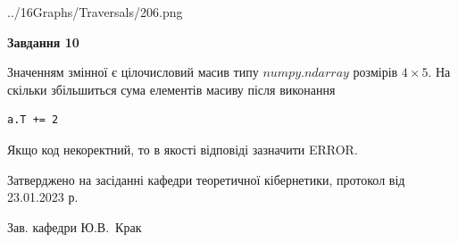 \documentclass[12pt, ukrainian]{article}
\begin{document}
{\begin {large}
\begin{center}
	{../16Graphs/Traversals/206.png}
\end{center}\par
\newpage

{\begin {center}\textbf{Завдання 10}\end {center}}\par
Значенням змінної  є цілочисловий масив типу $numpy.ndarray$ розмірів $4{\times}5$. На скільки збільшиться сума елементів масиву  після виконання
\begin{verbatim}
a.T += 2
\end{verbatim}


Якщо код некоректний, то в якості відповіді зазначити ERROR.\par
\newpage


\end {large}
}
{\smallskip \begin {small} Затверджено на засіданні кафедри теоретичної кібернетики, протокол  від   23.01.2023 р.\par\smallskip\smallskip
{\parbox {6.5 cm}{Зав. кафедри \dotfill Ю.В.~Крак}} \end{small}}
\end{document}
